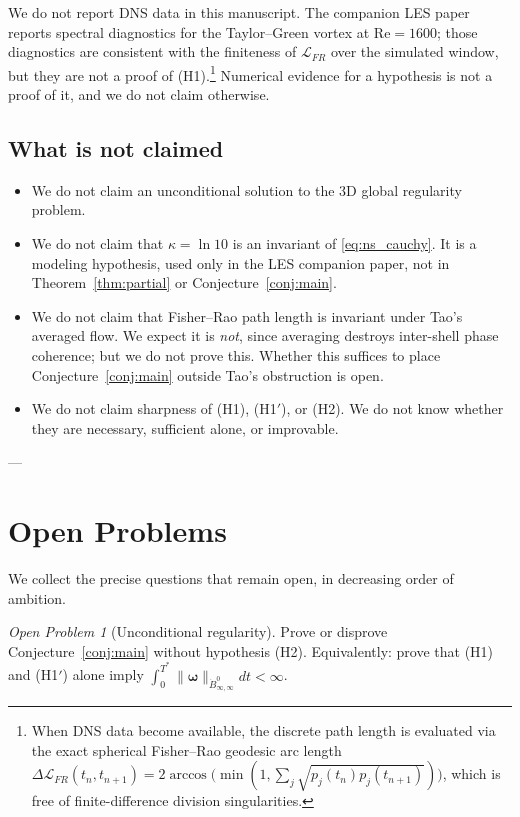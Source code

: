 \documentclass[11pt,a4paper]{article}
\theoremstyle{definition}
\theoremstyle{remark}
\newtheorem{openproblem}[theorem]{Open Problem}
\begin{document}
We do not report DNS data in this manuscript. The companion LES paper reports spectral diagnostics for the Taylor--Green vortex at $\mathrm{Re}=1600$; those diagnostics are consistent with the finiteness of $\mathcal{L}_{FR}$ over the simulated window, but they are not a proof of (H1).\footnote{When DNS data become available, the discrete path length is evaluated via the exact spherical Fisher--Rao geodesic arc length $\Delta\mathcal{L}_{FR}(t_n,t_{n+1}) = 2\arccos\big(\min(1,\sum_j \sqrt{p_j(t_n)p_j(t_{n+1})})\big)$, which is free of finite-difference division singularities.} Numerical evidence for a hypothesis is not a proof of it, and we do not claim otherwise.

\subsection{What is not claimed}

\begin{itemize}
  \item We do not claim an unconditional solution to the 3D global regularity problem.
  \item We do not claim that $\kappa=\ln 10$ is an invariant of \eqref{eq:ns_cauchy}. It is a modeling hypothesis, used only in the LES companion paper, not in Theorem~\ref{thm:partial} or Conjecture~\ref{conj:main}.
  \item We do not claim that Fisher--Rao path length is invariant under Tao's averaged flow. We expect it is \emph{not}, since averaging destroys inter-shell phase coherence; but we do not prove this. Whether this suffices to place Conjecture~\ref{conj:main} outside Tao's obstruction is open.
  \item We do not claim sharpness of (H1), (H1$'$), or (H2). We do not know whether they are necessary, sufficient alone, or improvable.
\end{itemize}

---

\section{Open Problems}

We collect the precise questions that remain open, in decreasing order of ambition.

\begin{openproblem}[Unconditional regularity]
Prove or disprove Conjecture~\ref{conj:main} without hypothesis (H2). Equivalently: prove that (H1) and (H1$'$) alone imply $\int_0^{T^*}\|\boldsymbol{\omega}\|_{\dot{B}^0_{\infty,\infty}}dt<\infty$.
\end{openproblem}
\end{document}
